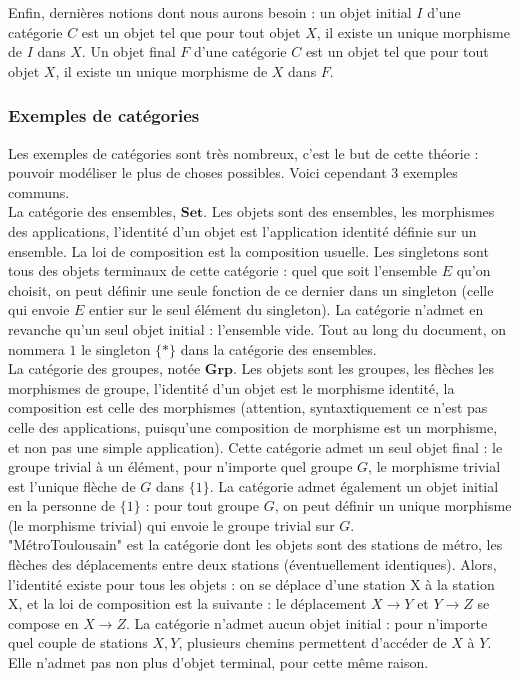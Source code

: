 \documentclass{article}
\begin{document}
Enfin, dernières notions dont nous aurons besoin : un objet initial $I$ d'une catégorie $C$
est un objet tel que pour tout objet $X$, il existe un unique morphisme de $I$ dans $X$. Un objet final $F$ d'une catégorie $C$ est un objet tel que pour tout objet $X$, il existe un unique morphisme de $ X$ dans $F$.

\subsubsection{Exemples de catégories}

Les exemples de catégories sont très nombreux, c'est le but de cette théorie : pouvoir modéliser le plus de choses possibles. Voici cependant 3 exemples communs. \\  
La catégorie des ensembles, $\mathbf{Set}$. Les objets sont des ensembles, les morphismes des applications, l'identité d'un objet est l'application identité définie sur un ensemble. La loi de composition est la composition usuelle. Les singletons sont tous des objets terminaux de cette catégorie : quel que soit l'ensemble $E$ qu'on choisit, on peut définir une seule fonction de ce dernier dans un singleton (celle qui envoie $E$ entier sur le seul élément du singleton). La catégorie n'admet en revanche qu'un seul objet initial : l'ensemble vide. Tout au long du document, on nommera $1$ le singleton $\{ * \} $ dans la catégorie des ensembles. 
\\ 
La catégorie des groupes, notée $\mathbf{Grp}$. Les objets sont les groupes, les flèches les morphismes de groupe, l'identité d'un objet est le morphisme identité, la composition est celle des morphismes (attention, syntaxtiquement ce n'est pas celle des applications, puisqu'une composition de morphisme est un morphisme, et non pas une simple application). Cette catégorie admet un seul objet final : le groupe trivial à un élément, pour n'importe quel groupe $G$, le morphisme trivial est l'unique flèche de $G$ dans $\{ 1 \}$. La catégorie admet également un objet initial en la personne de $\{ 1 \}$ : pour tout groupe $G$, on peut définir un unique morphisme (le morphisme trivial) qui envoie le groupe trivial sur $G$.
\\ 
"MétroToulousain" est la catégorie dont les objets sont des stations de métro, les flèches des déplacements entre deux stations (éventuellement identiques). Alors, l'identité existe pour tous les objets : on se déplace d'une station X à la station X, et la loi de composition est la suivante :  le déplacement $X \rightarrow Y$ et $ Y \rightarrow Z$ se compose en $X \rightarrow Z$. La catégorie n'admet aucun objet initial : pour n'importe quel couple de stations $X,Y$, plusieurs chemins permettent d'accéder de $X$ à $Y$. Elle n'admet pas non plus d'objet terminal, pour cette même raison.
\end{document}
